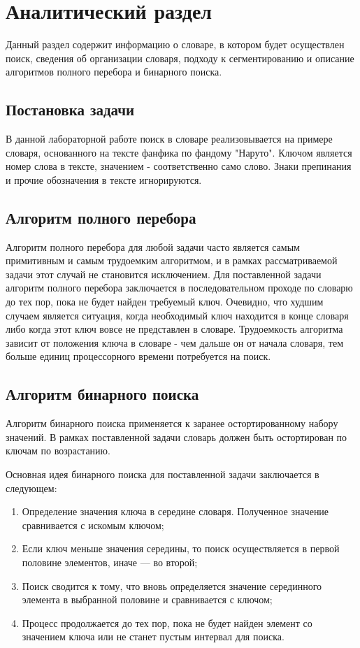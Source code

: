 \chapter{Аналитический раздел}\label{sec:analisys}

Данный раздел содержит информацию о словаре, в котором будет осуществлен поиск, сведения об организации словаря, подходу к сегментированию и описание алгоритмов полного перебора и бинарного поиска.

\section{Постановка задачи}

В данной лабораторной работе поиск в словаре реализовывается на примере словаря, основанного на тексте фанфика по фандому "Наруто". Клю­чом является номер слова в тексте, значением - соответственно само сло­во. Знаки препинания и прочие обозначения в тексте игнорируются.

\section{Алгоритм полного перебора}

Алгоритм полного перебора для любой задачи часто является са­мым примитивным и самым трудоемким алгоритмом, и в рамках рас­сматриваемой задачи этот случай не становится исключением. 
Для поставленной задачи алгоритм полного перебора заключает­ся в последовательном проходе по словарю до тех пор, пока не будет найден требуемый ключ. Очевидно, что худшим случаем является ситу­ация, когда необходимый ключ находится в конце словаря либо когда этот ключ вовсе не представлен в словаре. 
Трудоемкость алгоритма зависит от положения ключа в словаре - чем дальше он от начала словаря, тем больше единиц процессорного времени потребуется на поиск.

\section{Алгоритм бинарного поиска}

Алгоритм бинарного поиска применяется к заранее остортирован­ному набору значений. В рамках поставленной задачи словарь должен быть остортирован по ключам по возрастанию. \cite{knuth}

Основная идея бинарного поиска для поставленной задачи заклю­чается в следующем:
\begin{enumerate}
	\item Определение значения ключа в середине словаря. Полученное зна­чение сравнивается с искомым ключом;
	\item Если ключ меньше значения середины, то поиск осуществляется в первой половине элементов, иначе — во второй;
	\item Поиск сводится к тому, что вновь определяется значение середин­ного элемента в выбранной половине и сравнивается с ключом;
	\item Процесс продолжается до тех пор, пока не будет найден элемент со значением ключа или не станет пустым интервал для поиска.
\end{enumerate}


